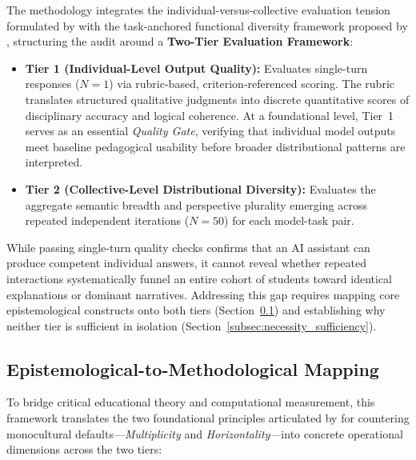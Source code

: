 The methodology integrates the individual-versus-collective evaluation tension formulated by \cite{Ashkinaze2025} with the task-anchored functional diversity framework proposed by \cite{Jain2025}, structuring the audit around a \textbf{Two-Tier Evaluation Framework}:
\begin{itemize}
  \item \textbf{Tier 1 (Individual-Level Output Quality):} Evaluates single-turn responses ($N = 1$) via rubric-based, criterion-referenced scoring. The rubric translates structured qualitative judgments into discrete quantitative scores of disciplinary accuracy and logical coherence. At a foundational level, Tier~1 serves as an essential \textit{Quality Gate}, verifying that individual model outputs meet baseline pedagogical usability before broader distributional patterns are interpreted.
  \item \textbf{Tier 2 (Collective-Level Distributional Diversity):} Evaluates the aggregate semantic breadth and perspective plurality emerging across repeated independent iterations ($N = 50$) for each model-task pair.
\end{itemize}
While passing single-turn quality checks confirms that an AI assistant can produce competent individual answers, it cannot reveal whether repeated interactions systematically funnel an entire cohort of students toward identical explanations or dominant narratives. Addressing this gap requires mapping core epistemological constructs onto both tiers (Section~\ref{subsec:epistemic_mapping}) and establishing why neither tier is sufficient in isolation (Section~\ref{subsec:necessity_sufficiency}).

\subsection{Epistemological-to-Methodological Mapping}
\label{subsec:epistemic_mapping}
To bridge critical educational theory and computational measurement, this framework translates the two foundational principles articulated by \cite{Warren2020} for countering monocultural defaults---\textit{Multiplicity} and \textit{Horizontality}---into concrete operational dimensions across the two tiers:

